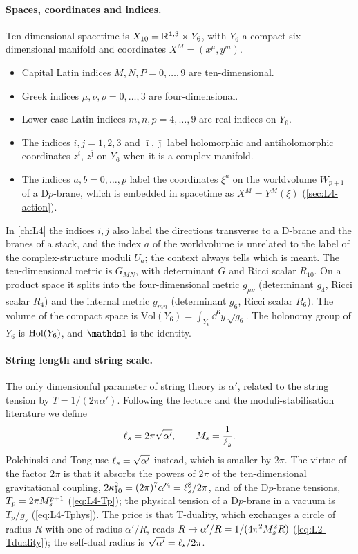 \paragraph{Spaces, coordinates and indices.} Ten-dimensional spacetime is $X_{10} = \mathbb{R}^{1,3}\times Y_6$, with $Y_6$ a compact six-dimensional manifold and coordinates $X^M = (x^\mu, y^m)$.
\begin{itemize}
  \item Capital Latin indices $M,N,P = 0,\dots,9$ are ten-dimensional.
  \item Greek indices $\mu,\nu,\rho = 0,\dots,3$ are four-dimensional.
  \item Lower-case Latin indices $m,n,p = 4,\dots,9$ are real indices on $Y_6$.
  \item The indices $i,j = 1,2,3$ and $\bar\imath,\bar\jmath$ label holomorphic and antiholomorphic coordinates $z^i$, $\bar z^{\bar\jmath}$ on $Y_6$ when it is a complex manifold.
  \item The indices $a,b = 0,\dots,p$ label the coordinates $\xi^a$ on the worldvolume $W_{p+1}$ of a D$p$-brane, which is embedded in spacetime as $X^M = Y^M(\xi)$ (\cref{sec:L4-action}).
\end{itemize}
In \cref{ch:L4} the indices $i,j$ also label the directions transverse to a D-brane and the branes of a stack, and the index $a$ of the worldvolume is unrelated to the label of the complex-structure moduli $U_a$; the context always tells which is meant.
The ten-dimensional metric is $G_{MN}$, with determinant $G$ and Ricci scalar $R_{10}$. On a product space it splits into the four-dimensional metric $g_{\mu\nu}$ (determinant $g_4$, Ricci scalar $R_4$) and the internal metric $g_{mn}$ (determinant $g_6$, Ricci scalar $R_6$). The volume of the compact space is $\mathrm{Vol}(Y_6) = \int_{Y_6}\dd^6y\,\sqrt{g_6}$. The holonomy group of $Y_6$ is $\operatorname{Hol}(Y_6)$, and $\one$ is the identity.

\paragraph{String length and string scale.} The only dimensionful parameter of string theory is $\alpha'$, related to the string tension by $T = 1/(2\pi\alpha')$. Following the lecture and the moduli-stabilisation literature we define
\begin{equation*}
  \ell_s = 2\pi\sqrt{\alpha'} ,\qquad M_{s} = \frac{1}{\ell_s} .
\end{equation*}
Polchinski and Tong use $\ell_s = \sqrt{\alpha'}$ instead, which is smaller by $2\pi$. The virtue of the factor $2\pi$ is that it absorbs the powers of $2\pi$ of the ten-dimensional gravitational coupling, $2\kappa_{10}^2 = (2\pi)^7\alpha'^4 = \ell_s^8/2\pi$, and of the D$p$-brane tensions, $T_p = 2\pi M_{s}^{p+1}$ (\cref{eq:L4-Tp}); the physical tension of a D$p$-brane in a vacuum is $T_p/g_s$ (\cref{eq:L4-Tphys}). The price is that T-duality, which exchanges a circle of radius $R$ with one of radius $\alpha'/R$, reads $R\to\alpha'/R = 1/(4\pi^2M_{s}^2R)$ (\cref{eq:L2-Tduality}); the self-dual radius is $\sqrt{\alpha'} = \ell_s/2\pi$.

